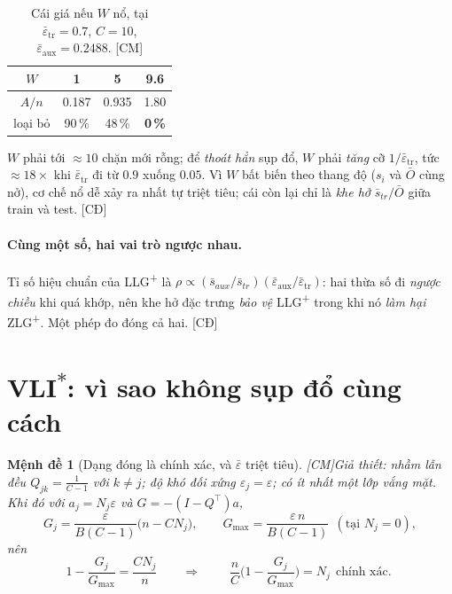 \documentclass[11pt,a4paper]{article}
\newtheorem{menhde}[dinhly]{Mệnh đề}
\theoremstyle{remark}
\newcommand{\epstr}{\bar\varepsilon_{\mathrm{tr}}}
\newcommand{\epsaux}{\bar\varepsilon_{\mathrm{aux}}}
\newcommand{\CM}{\textsf{[CM]}}
\newcommand{\CD}{\textsf{[CĐ]}}
\begin{document}
\begin{table}[htbp]
\centering
\caption{Cái giá nếu $W$ nổ, tại $\epstr=0.7$, $C=10$, $\epsaux=0.2488$. \CM}
\label{tab:Wgia}
\small
\begin{tabular}{@{}cccc@{}}
\toprule
$W$ & 1 & 5 & \textbf{9.6} \\
\midrule
$A/n$ & 0.187 & 0.935 & 1.80 \\
loại bỏ & 90\,\% & 48\,\% & \textbf{0\,\%} \\
\bottomrule
\end{tabular}
\end{table}

$W$ phải tới $\approx10$ chặn mới rỗng; để \emph{thoát hẳn} sụp đổ, $W$ phải
\emph{tăng} cỡ $1/\epstr$, tức $\approx18\times$ khi $\epstr$ đi từ $0.9$ xuống
$0.05$. Vì $W$ bất biến theo thang độ ($s_i$ và $\bar O$ cùng nở), cơ chế nổ dễ
xảy ra nhất tự triệt tiêu; cái còn lại chỉ là \emph{khe hở} $\bar s_{tr}/\bar O$
giữa train và test. \CD{}

\paragraph{Cùng một số, hai vai trò ngược nhau.} Tỉ số hiệu chuẩn của
LLG\textsuperscript{+} là $\rho\propto(\bar s_{aux}/\bar s_{tr})(\epsaux/\epstr)$:
hai thừa số đi \emph{ngược chiều} khi quá khớp, nên khe hở đặc trưng
\emph{bảo vệ} LLG\textsuperscript{+} trong khi nó \emph{làm hại}
ZLG\textsuperscript{+}. Một phép đo đóng cả hai. \CD{}

\section{VLI\textsuperscript{$*$}: vì sao không sụp đổ cùng cách}

\begin{menhde}[Dạng đóng là chính xác, và $\bar\varepsilon$ triệt tiêu] \CM\label{md:vlistar}
Giả thiết: nhầm lẫn đều $Q_{jk}=\frac{1}{C-1}$ với $k\ne j$; độ khó đối xứng
$\varepsilon_j=\varepsilon$; có ít nhất một lớp vắng mặt. Khi đó với
$a_j=N_j\varepsilon$ và $G=-(I-Q^\top)a$,
\[
  G_j=\frac{\varepsilon}{B(C-1)}\big(n-C N_j\big),
  \qquad
  G_{\max}=\frac{\varepsilon\,n}{B(C-1)}\ \ (\text{tại } N_j=0),
\]
nên
\[
  1-\frac{G_j}{G_{\max}}=\frac{C N_j}{n}
  \qquad\Longrightarrow\qquad
  \boxed{\;\frac{n}{C}\Big(1-\frac{G_j}{G_{\max}}\Big)=N_j\ \ \text{chính xác.}\;}
\]
\end{menhde}
\end{document}
